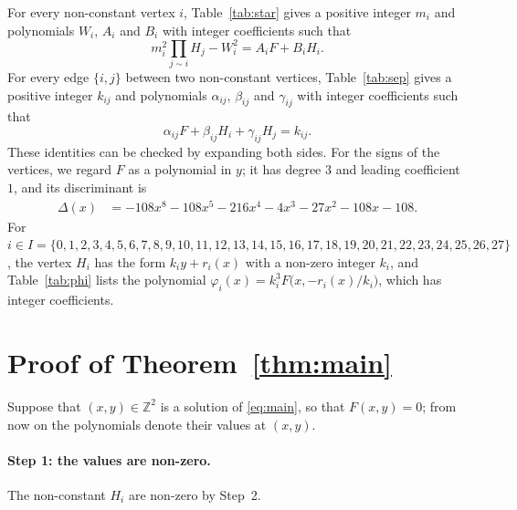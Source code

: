 \documentclass[11pt]{article}
\newcommand{\Z}{\mathbb{Z}}
\begin{document}
For every non-constant vertex $i$, Table~\ref{tab:star} gives a positive integer $m_{i}$ and polynomials $W_{i}$, $A_{i}$ and $B_{i}$ with integer coefficients such that
\begin{equation}\label{eq:star}
m_i^2\prod_{j\sim i}H_j-W_i^2=A_iF+B_iH_i.
\end{equation}
For every edge $\{i,j\}$ between two non-constant vertices, Table~\ref{tab:sep} gives a positive integer $k_{ij}$ and polynomials $\alpha_{ij}$, $\beta_{ij}$ and $\gamma_{ij}$ with integer coefficients such that
\begin{equation}\label{eq:sep}
\alpha_{ij}F+\beta_{ij}H_i+\gamma_{ij}H_j=k_{ij}.
\end{equation}
These identities can be checked by expanding both sides.
For the signs of the vertices, we regard $F$ as a polynomial in $y$; it has degree $3$ and leading coefficient $1$, and its discriminant is
\begin{align*}
\Delta(x)&=-108x^{8}-108x^{5}-216x^{4}-4x^{3}-27x^{2}-108x-108.
\end{align*}
For $i\in I=\{0,\allowbreak 1,\allowbreak 2,\allowbreak 3,\allowbreak 4,\allowbreak 5,\allowbreak 6,\allowbreak 7,\allowbreak 8,\allowbreak 9,\allowbreak 10,\allowbreak 11,\allowbreak 12,\allowbreak 13,\allowbreak 14,\allowbreak 15,\allowbreak 16,\allowbreak 17,\allowbreak 18,\allowbreak 19,\allowbreak 20,\allowbreak 21,\allowbreak 22,\allowbreak 23,\allowbreak 24,\allowbreak 25,\allowbreak 26,\allowbreak 27\}$, the vertex $H_i$ has the form $k_iy+r_i(x)$ with a non-zero integer $k_i$, and Table~\ref{tab:phi} lists the polynomial $\varphi_i(x)=k_i^3F\bigl(x,-r_i(x)/k_i\bigr)$, which has integer coefficients.

\section{Proof of Theorem~\ref{thm:main}}

Suppose that $(x,y)\in\Z^2$ is a solution of \eqref{eq:main}, so that $F(x,y)=0$; from now on the polynomials denote their values at $(x,y)$.
\paragraph{Step 1: the values are non-zero.} The non-constant $H_i$ are non-zero by Step~2.
\end{document}
